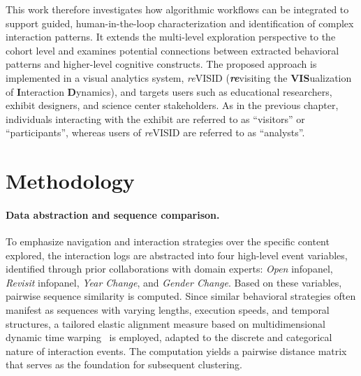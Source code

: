 This work therefore investigates how algorithmic workflows can be integrated to support guided, human-in-the-loop characterization and identification of complex interaction patterns.
It extends the multi-level exploration perspective to the cohort level and examines potential connections between extracted behavioral patterns and higher-level cognitive constructs.
The proposed approach is implemented in a visual analytics system, \textit{re}\textsc{VISID} (\textit{\textbf{re}}visiting the \textbf{VIS}ualization of \textbf{I}nteraction \textbf{D}ynamics), and targets users such as educational researchers, exhibit designers, and science center stakeholders.
As in the previous chapter, individuals interacting with the exhibit are referred to as ``visitors'' or ``participants'', whereas users of \textit{re}\textsc{VISID} are referred to as ``analysts''.






\section{Methodology}

\paragraph{Data abstraction and sequence comparison.}
To emphasize navigation and interaction strategies over the specific content explored, the interaction logs are abstracted into four high-level event variables, identified through prior collaborations with domain experts: \textit{Open} infopanel, \textit{Revisit} infopanel, \textit{Year Change}, and \textit{Gender Change}.
Based on these variables, pairwise sequence similarity is computed.
Since similar behavioral strategies often manifest as sequences with varying lengths, execution speeds, and temporal structures, a tailored elastic alignment measure based on multidimensional dynamic time warping~\cite{shokoohi2017generalizing} is employed, adapted to the discrete and categorical nature of interaction events.
The computation yields a pairwise distance matrix that serves as the foundation for subsequent clustering.


